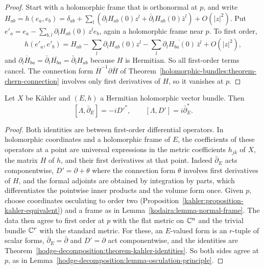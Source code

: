 \begin{proof}
Start with a holomorphic frame that is orthonormal at $p$, and write $H_{ab} = h(e_a, e_b) = \delta_{ab} + \sum_l(\partial_lH_{ab}(0)z^l + \bar\partial_lH_{ab}(0)\bar z^l) + O(|z|^2)$.
Put $e'_a = e_a - \sum_{b,l}\partial_lH_{ab}(0)\,z^le_b$, again a holomorphic frame near $p$. To first order,
\[
h(e'_a, e'_b) = H_{ab} - \sum_l\partial_lH_{ab}(0)z^l - \sum_l\overline{\partial_lH_{ba}(0)}\,\bar z^l + O(|z|^2),
\]
and $\overline{\partial_lH_{ba}} = \bar\partial_l\overline{H_{ba}} = \bar\partial_lH_{ab}$ because $H$ is Hermitian. So all first-order terms cancel. The connection
form $\overline{H}^{-1}\partial\overline{H}$ of Theorem~\ref{holomorphic-bundles:theorem-chern-connection} involves only first derivatives of $H$,
so it vanishes at $p$.
\end{proof}

\begin{theorem}\label{kodaira:theorem-kahler-identities-bundle}
Let $X$ be K\"ahler and $(E, h)$ a Hermitian holomorphic vector bundle. Then
\[
[\Lambda, \bar\partial_E] = -iD'^*, \qquad [\Lambda, D'] = i\bar\partial_E^* .
\]
\end{theorem}

\begin{proof}
Both identities are between first-order differential operators. In holomorphic coordinates and a holomorphic frame of $E$, the coefficients
of these operators at a point are universal expressions in the metric coefficients $h_{j\bar k}$ of $X$, the matrix $H$ of $h$, and their
first derivatives at that point. Indeed $\bar\partial_E$ acts componentwise, $D' = \partial + \theta$ where the connection form $\theta$ involves
first derivatives of $H$, and the formal adjoints are obtained by integration by parts, which differentiates the pointwise inner products and
the volume form once. Given $p$, choose coordinates osculating to order two (Proposition~\ref{kahler:proposition-kahler-equivalent}) and a frame
as in Lemma~\ref{kodaira:lemma-normal-frame}. The data then agree to first order at $p$ with the flat metric on $\mathbb{C}^n$ and the trivial bundle
$\mathbb{C}^r$ with the standard metric. For these, an $E$-valued form is an $r$-tuple of scalar forms, $\bar\partial_E = \bar\partial$ and $D' = \partial$
act componentwise, and the identities are Theorem~\ref{hodge-decomposition:theorem-kahler-identities}. So both sides agree at $p$, as in
Lemma~\ref{hodge-decomposition:lemma-osculation-principle}.
\end{proof}

